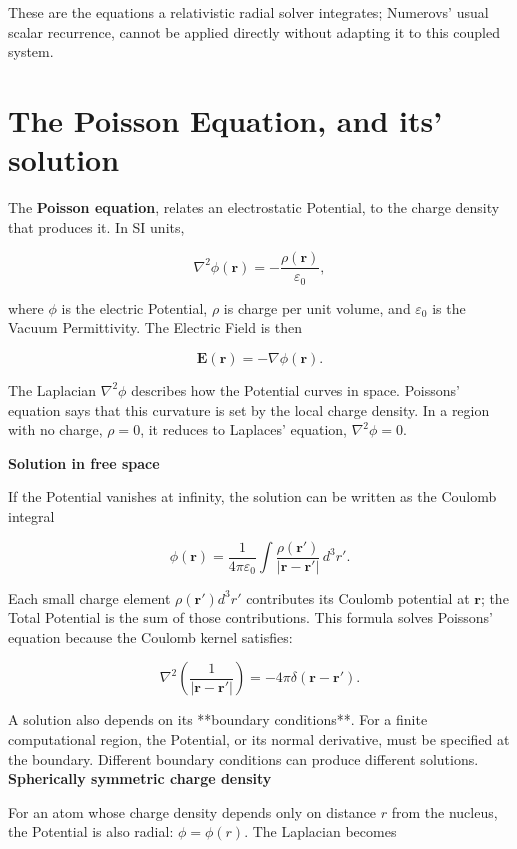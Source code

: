 \documentclass[a4paper, 10pt, onepage]{elegantbook}
\begin{document}
These are the equations a relativistic radial solver integrates; Numerovs' usual scalar recurrence, cannot be applied directly without adapting it to this coupled system.  \\

\section{The Poisson Equation, and its' solution}

The \textbf{Poisson equation}, relates an electrostatic Potential, to the charge density that produces it. In SI units,

\[
\nabla^2\phi(\mathbf r)=-\frac{\rho(\mathbf r)}{\varepsilon_0},
\]

where \(\phi\) is the electric Potential, \(\rho\) is charge per unit volume, and \(\varepsilon_0\) is the Vacuum Permittivity. The Electric Field is then

\[
\mathbf E(\mathbf r)=-\nabla\phi(\mathbf r).
\]

The Laplacian \(\nabla^2\phi\) describes how the Potential curves in space. Poissons' equation says that this curvature is set by the local charge density. In a region with no charge, \(\rho=0\), it reduces to Laplaces' equation, \(\nabla^2\phi=0\).

\textbf{Solution in free space}

If the Potential vanishes at infinity, the solution can be written as the Coulomb integral

\[
\phi(\mathbf r)
=
\frac{1}{4\pi\varepsilon_0}
\int
\frac{\rho(\mathbf r')}{|\mathbf r-\mathbf r'|}
\,d^3r'.
\]

Each small charge element \(\rho(\mathbf r')d^3r'\) contributes its Coulomb potential at \(\mathbf r\); the Total Potential is the sum of those contributions. This formula solves Poissons' equation because the Coulomb kernel satisfies:  

\[
\nabla^2\left(\frac{1}{|\mathbf r-\mathbf r'|}\right)
=-4\pi\delta(\mathbf r-\mathbf r').
\]

A solution also depends on its **boundary conditions**. For a finite computational region, the Potential, or its normal derivative, must be specified at the boundary. Different boundary conditions can produce different solutions.  \\

\textbf{Spherically symmetric charge density}

For an atom whose charge density depends only on distance \(r\) from the nucleus, the Potential is also radial: \(\phi=\phi(r)\). The Laplacian becomes
\end{document}
